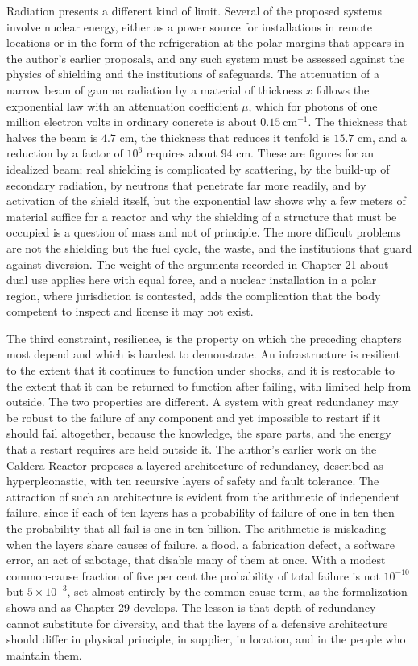 Radiation presents a different kind of limit. Several of the proposed systems involve nuclear energy, either as a power source for installations in remote locations or in the form of the refrigeration at the polar margins that appears in the author's earlier proposals, and any such system must be assessed against the physics of shielding and the institutions of safeguards. The attenuation of a narrow beam of gamma radiation by a material of thickness $x$ follows the exponential law with an attenuation coefficient $\mu$, which for photons of one million electron volts in ordinary concrete is about $0.15\ \mathrm{cm^{-1}}$. The thickness that halves the beam is $4.7$ cm, the thickness that reduces it tenfold is $15.7$ cm, and a reduction by a factor of $10^6$ requires about $94$ cm. These are figures for an idealized beam; real shielding is complicated by scattering, by the build-up of secondary radiation, by neutrons that penetrate far more readily, and by activation of the shield itself, but the exponential law shows why a few meters of material suffice for a reactor and why the shielding of a structure that must be occupied is a question of mass and not of principle. The more difficult problems are not the shielding but the fuel cycle, the waste, and the institutions that guard against diversion. The weight of the arguments recorded in Chapter 21 about dual use applies here with equal force, and a nuclear installation in a polar region, where jurisdiction is contested, adds the complication that the body competent to inspect and license it may not exist.

The third constraint, resilience, is the property on which the preceding chapters most depend and which is hardest to demonstrate. An infrastructure is resilient to the extent that it continues to function under shocks, and it is restorable to the extent that it can be returned to function after failing, with limited help from outside. The two properties are different. A system with great redundancy may be robust to the failure of any component and yet impossible to restart if it should fail altogether, because the knowledge, the spare parts, and the energy that a restart requires are held outside it. The author's earlier work on the Caldera Reactor proposes a layered architecture of redundancy, described as hyperpleonastic, with ten recursive layers of safety and fault tolerance. The attraction of such an architecture is evident from the arithmetic of independent failure, since if each of ten layers has a probability of failure of one in ten then the probability that all fail is one in ten billion. The arithmetic is misleading when the layers share causes of failure, a flood, a fabrication defect, a software error, an act of sabotage, that disable many of them at once. With a modest common-cause fraction of five per cent the probability of total failure is not $10^{-10}$ but $5\times10^{-3}$, set almost entirely by the common-cause term, as the formalization shows and as Chapter 29 develops. The lesson is that depth of redundancy cannot substitute for diversity, and that the layers of a defensive architecture should differ in physical principle, in supplier, in location, and in the people who maintain them.

